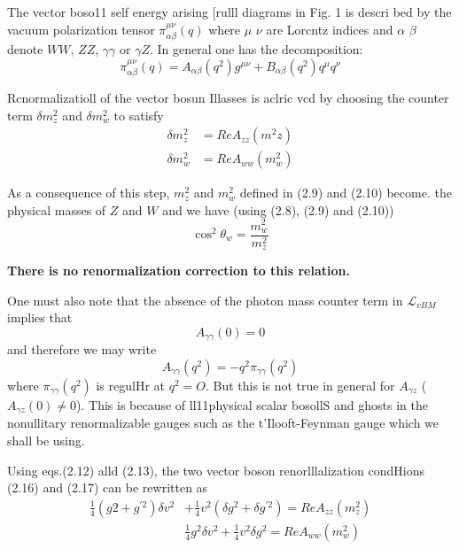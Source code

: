 The vector boso11 self energy arising [rulll diagrams in Fig. 1 is descri bed
by the vacuum polarization tensor $\pi^{\mu \nu}_{\alpha \beta}(q)$ where $\mu$ $\nu$ are Lorcntz indices and
$\alpha$ $\beta$ denote $WW$, $ZZ$, $\gamma \gamma$ or $\gamma Z$. In general one has the decomposition: 
\begin{equation}
\pi_{\alpha \beta}^{\mu \nu}(q) = A_{\alpha \beta}(q^{2})g^{\mu \nu} + B_{\alpha \beta}(q^{2}) q^{\mu} q^{\nu}\tag{2.15} 
\end{equation}

Rcnormalizatioll of the vector bosun Illasses is aclric vcd by choosing the counter term $\delta m_{z}^{2}$ and $\delta m^{2}_{w}$ to satisfy
\begin{align*}
\delta m^{2}_{z} &= Re A_{zz}(m^{2}_{}z)\tag{2.16}\\
\delta m^{2}_{w} &= Re A_{ww}(m^{2}_{w})\tag{2.17}
\end{align*}

As a consequence of this step, $m^{2}_{z}$ and $m^{2}_{w}$ defined in (2.9) and (2.10) become.
the physical masses of $Z$ and $W$ and we have (using (2.8), (2.9) and (2.10)) 
\begin{equation}
\cos^{2}\theta_{w} = \frac{m^{2}_{w}}{m^{2}_{z}}\tag{2.18}
\end{equation}

\textbf{There is no renormalization correction to this relation.}

One must also note that the absence of the photon mass counter term in
$\mathcal{L}_{v B M}$ implies that 
\begin{equation}
A_{\gamma \gamma}(0) = 0\tag{2.19}
\end{equation}
and therefore we may write
\begin{equation}
A_{\gamma \gamma}(q^{2}) =-q^{2} \pi_{\gamma \gamma}(q^{2})\tag{2.20}
\end{equation}
where $\pi_{\gamma \gamma}(q^{2})$ is regulHr at $q^{2} = O$. But this is not true in general for $A_{\gamma z}$
($A_{\gamma z}(0) \neq 0$). This is because of ll11physical scalar bosollS and ghosts in the
nonullitary renormalizable gauges such as the t'Ilooft-Feynman gauge which we
shall be using.

Using eqs.(2.12) alld (2.13), the two vector boson renorlllalization condHions
(2.16) and (2.17) can be rewritten as
\begin{align}
\frac{1}{4}(g{2} + g^{' 2}) \delta v^{2} & + \frac{1}{4}v^{2} (\delta g^{2} + \delta g^{' 2}) = Re A_{zz} (m^{2}_{z})\tag{2.21}\\
 & \frac{1}{4}g^{2} \delta v^{2} + \frac{1}{4} v^{2} \delta g^{2} = Re A_{ww} (m^{2}_{w})\tag{2.22}
\end{align}

